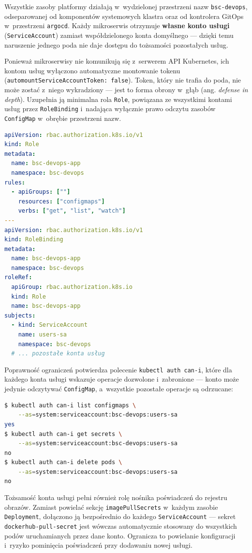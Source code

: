 Wszystkie zasoby platformy działają w~wydzielonej przestrzeni nazw \texttt{bsc-devops}, odseparowanej od komponentów systemowych klastra oraz od kontrolera GitOps w~przestrzeni \texttt{argocd}. Każdy mikroserwis otrzymuje \textbf{własne konto usługi} (\texttt{ServiceAccount}) zamiast współdzielonego konta domyślnego --- dzięki temu naruszenie jednego poda nie daje dostępu do tożsamości pozostałych usług.

Ponieważ mikroserwisy nie komunikują się z~serwerem API Kubernetes, ich kontom usług wyłączono automatyczne montowanie tokenu (\texttt{automountServiceAccountToken: false}). Token, który nie trafia do poda, nie może zostać z~niego wykradziony --- jest to forma obrony w~głąb (ang. \textit{defense in depth}). Uzupełnia ją minimalna rola \texttt{Role}, powiązana ze wszystkimi kontami usług przez \texttt{RoleBinding} i~nadająca wyłącznie prawo odczytu zasobów \texttt{ConfigMap} w~obrębie przestrzeni nazw.

\begin{lstlisting}[language=yaml, caption={Minimalna rola i~powiązanie RBAC dla kont usług (infrastructure/helm/bsc-devops/templates/rbac.yaml)}, label={lst:rbac}]
apiVersion: rbac.authorization.k8s.io/v1
kind: Role
metadata:
  name: bsc-devops-app
  namespace: bsc-devops
rules:
  - apiGroups: [""]
    resources: ["configmaps"]
    verbs: ["get", "list", "watch"]
---
apiVersion: rbac.authorization.k8s.io/v1
kind: RoleBinding
metadata:
  name: bsc-devops-app
  namespace: bsc-devops
roleRef:
  apiGroup: rbac.authorization.k8s.io
  kind: Role
  name: bsc-devops-app
subjects:
  - kind: ServiceAccount
    name: users-sa
    namespace: bsc-devops
  # ... pozostałe konta usług
\end{lstlisting}

Poprawność ograniczeń potwierdza polecenie \texttt{kubectl auth can-i}, które dla każdego konta usługi wskazuje operacje dozwolone i~zabronione --- konto może jedynie odczytywać \texttt{ConfigMap}, a~wszystkie pozostałe operacje są odrzucane:

\begin{lstlisting}[language=bash, caption={Weryfikacja minimalnych uprawnień konta usługi \texttt{users-sa}}, label={lst:authcani}]
$ kubectl auth can-i list configmaps \
    --as=system:serviceaccount:bsc-devops:users-sa
yes
$ kubectl auth can-i get secrets \
    --as=system:serviceaccount:bsc-devops:users-sa
no
$ kubectl auth can-i delete pods \
    --as=system:serviceaccount:bsc-devops:users-sa
no
\end{lstlisting}

Tożsamość konta usługi pełni również rolę nośnika poświadczeń do rejestru obrazów. Zamiast powielać sekcję \texttt{imagePullSecrets} w~każdym zasobie \texttt{Deployment}, dołączono ją bezpośrednio do każdego \texttt{ServiceAccount} --- sekret \texttt{dockerhub-pull-secret} jest wówczas automatycznie stosowany do wszystkich podów uruchamianych przez dane konto. Ogranicza to powielanie konfiguracji i~ryzyko pominięcia poświadczeń przy dodawaniu nowej usługi.
